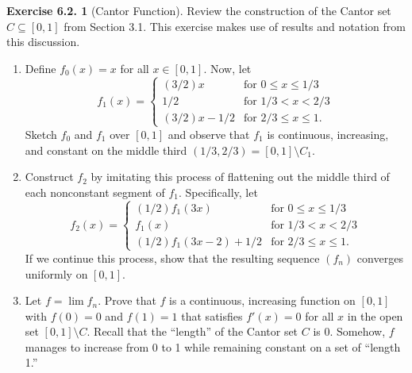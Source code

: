 \documentclass[12pt]{article}
\theoremstyle{definition}
\theoremstyle{exercise}
\newtheorem{exercise}{Exercise 6.2.}
\theoremstyle{solution}
\begin{document}
\begin{exercise}[Cantor Function]
\label{ex:12}
    Review the construction of the Cantor set \( C \subseteq [0, 1] \) from Section 3.1. This exercise makes use of results and notation from this discussion.
    \begin{enumerate}
        \item Define \( f_0(x) = x \) for all \( x \in [0, 1] \). Now, let
        \[
            f_1(x) = \begin{cases}
                (3/2)x & \text{for } 0 \leq x \leq 1/3 \\
                1/2 & \text{for } 1/3 < x < 2/3 \\
                (3/2)x - 1/2 & \text{for } 2/3 \leq x \leq 1.
            \end{cases}
        \]
        Sketch \( f_0 \) and \( f_1 \) over \( [0, 1] \) and observe that \( f_1 \) is continuous, increasing, and constant on the middle third \( (1/3, 2/3) = [0, 1] \setminus C_1 \).

        \item Construct \( f_2 \) by imitating this process of flattening out the middle third of each nonconstant segment of \( f_1 \). Specifically, let
        \[
            f_2(x) = \begin{cases}
                (1/2) f_1(3x) & \text{for } 0 \leq x \leq 1/3 \\
                f_1(x) & \text{for } 1/3 < x < 2/3 \\
                (1/2) f_1(3x - 2) + 1/2 & \text{for } 2/3 \leq x \leq 1.
            \end{cases}
        \]
        If we continue this process, show that the resulting sequence \( (f_n) \) converges uniformly on \( [0, 1] \).

        \item Let \( f = \lim f_n \). Prove that \( f \) is a continuous, increasing function on \( [0, 1] \) with \( f(0) = 0 \) and \( f(1) = 1 \) that satisfies \( f'(x) = 0 \) for all \( x \) in the open set \( [0, 1] \setminus C \). Recall that the ``length'' of the Cantor set \( C \) is 0. Somehow, \( f \) manages to increase from 0 to 1 while remaining constant on a set of ``length 1.''
    \end{enumerate}
\end{exercise}
\end{document}
